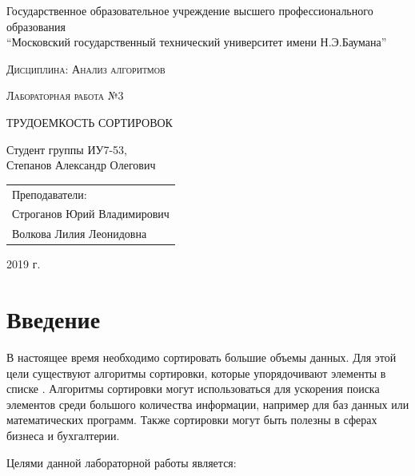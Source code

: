 \documentclass[a4paper,12pt]{article}
\newcommand{\anonsection}[1]{\section*{#1}\addcontentsline{toc}{section}{#1}}
\begin{document}
\begin{titlepage}

    \begin{center}
        \large
        Государственное образовательное учреждение высшего профессионального образования\\
        “Московский государственный технический университет имени Н.Э.Баумана”
        \vspace{3cm}

        \textsc{Дисциплина: Анализ алгоритмов}
        \vspace{0.5cm}

        \textsc{Лабораторная работа №3}
        \vspace{3cm}

        {\LARGE ТРУДОЕМКОСТЬ СОРТИРОВОК}
        \vspace{3cm}

        Студент группы ИУ7-53,\\
        Степанов Александр Олегович
        \vfill
    \end{center}

    \begin{flushright}
        \begin{tabular}{l}
            Преподаватели:\\
            Строганов Юрий Владимирович\\
            Волкова Лилия Леонидовна
        \end{tabular}
    \end{flushright}

    \begin{center}

        2019 г.

    \end{center}

\end{titlepage}

\tableofcontents

\newpage
\anonsection{Введение}

В настоящее время необходимо сортировать большие объемы данных. Для этой
цели существуют алгоритмы сортировки, которые упорядочивают элементы в
списке \cite{knuth}. Алгоритмы сортировки могут использоваться для ускорения поиска элементов
среди большого количества информации, например для баз данных или математических программ.
Также сортировки могут быть полезны в сферах бизнеса и бухгалтерии.

Целями данной лабораторной работы является:
\end{document}
